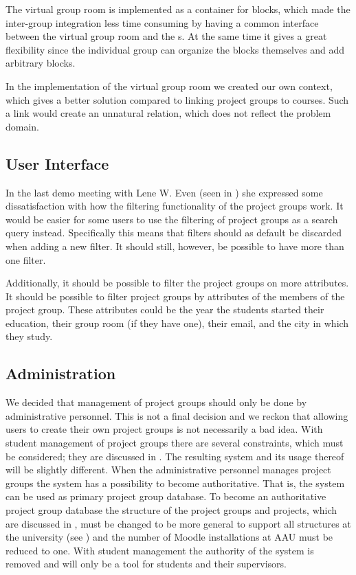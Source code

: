 The virtual group room is implemented as a container for blocks, which made the inter-group integration less time consuming by having a common interface between the virtual group room and the \detdeandrelaver{}s.
At the same time it gives a great flexibility since the individual group can organize the blocks themselves and add arbitrary blocks.

In the implementation of the virtual group room we created our own context, which gives a better solution compared to linking project groups to courses. 
Such a link would create an unnatural relation, which does not reflect the problem domain.  

\subsection{User Interface}
In the last demo meeting with Lene W. Even (seen in ) she expressed some dissatisfaction with how the filtering functionality of the project groups work.
It would be easier for some users to use the filtering of project groups as a search query instead.
Specifically this means that filters should as default be discarded when adding a new filter.
It should still, however, be possible to have more than one filter.

Additionally, it should be possible to filter the project groups on more attributes.
It should be possible to filter project groups by attributes of the members of the project group.
These attributes could be the year the students started their education, their group room (if they have one), their email, and the city in which they study.


\subsection{Administration}
\label{sec:evalAdministration}
We decided that management of project groups should only be done by administrative personnel. 
This is not a final decision and we reckon that allowing users to create their own project groups is not necessarily a bad idea. 
With student management of project groups there are several constraints, which must be considered; they are discussed in . 
The resulting system and its usage thereof will be slightly different.
When the administrative personnel manages project groups the system has a possibility to become authoritative.
That is, the system can be used as primary project group database. 
To become an authoritative project group database the structure of the project groups and projects, which are discussed in , must be changed to be more general to support all structures at the university (see ) and the number of Moodle installations at AAU must be reduced to one. 
With student management the authority of the system is removed and will only be a tool for students and their supervisors.


